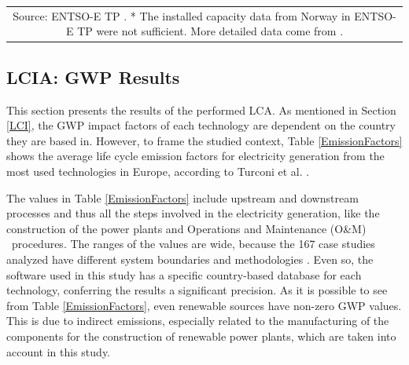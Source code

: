 \begin{table}[]
\begin{tabular}{@{}c@{}} 
\multicolumn{1}{p{\textwidth}}{\footnotesize {Source:} ENTSO-E TP \cite{Entso-eProduction}. * The installed capacity data from Norway in ENTSO-E TP were not sufficient. More detailed data come from  \cite{ssb2017StatisticsNorway}.}
\end{tabular}
\label{table:capacity}
\end{table}


\subsection{LCIA: GWP Results}
\label{LCIA}

This section presents the results of the performed LCA. As mentioned in Section \ref{LCI}, the GWP impact factors of each technology are dependent on the country they are based in. However, to frame the studied context, Table \ref{EmissionFactors} shows the average life cycle emission factors for electricity generation from the most used technologies in Europe, according to Turconi et al. \cite{Turconi2013LifeLimitations}.

The values in  Table \ref{EmissionFactors} include upstream and downstream processes and thus all the steps involved in the electricity generation, like the construction of the power plants and Operations and Maintenance (O\&M)%
~procedures. The ranges of the values are wide, because the 167 case studies analyzed have different system boundaries and methodologies \cite{Turconi2013LifeLimitations}. Even so, the software used in this study has a specific country-based database for each technology, conferring the results a significant precision. {As it is possible to see from Table \ref{EmissionFactors}, even renewable sources have non-zero GWP values. This is due to indirect emissions, especially related to the manufacturing of the components for the construction of renewable power plants, which are taken into account in this study.}  

